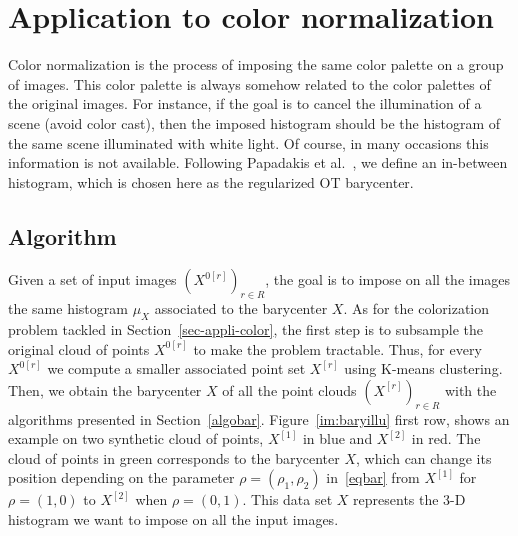 \section{Application to color normalization}

Color normalization is the process of imposing the same color palette on a group of images. This color palette is always somehow related to the color palettes of the original images. For instance, if the goal is to cancel the illumination of a scene (avoid color cast), then the imposed histogram should be the histogram of the same scene illuminated with white light. Of course, in many occasions this information is not available. Following Papadakis et al.~\cite{Papadakis_ip11}, we define an in-between histogram, which is chosen here as the regularized OT barycenter. 



\subsection{Algorithm}

Given a set of input images $(X^{0[r]})_{r \in R}$, the goal is to impose on all the images the same histogram $\mu_X$ associated to the barycenter $X$. As for the colorization problem tackled in Section~\ref{sec-appli-color}, the first step is to subsample the original cloud of points $X^{0[r]}$ to make the problem tractable. Thus, for every $X^{0[r]}$ we compute a smaller associated point set $X^{[r]}$ using K-means clustering. Then, we obtain the barycenter $X$ of all the point clouds $(X^{[r]})_{r \in R}$ with the algorithms presented in Section~\ref{algobar}. Figure~\ref{im:baryillu} first row, shows an example on two synthetic cloud of points, $X^{[1]}$ in blue and $X^{[2]}$ in red. The cloud of points in green corresponds to the barycenter $X$, which can change its position depending on the parameter $\rho=(\rho_1,\rho_2)$ in~\eqref{eqbar} from $X^{[1]}$ for $\rho=(1,0)$ to $X^{[2]}$ when $\rho=(0,1)$.  This data set $X$ represents the 3-D histogram we want to impose on all the input images. 

